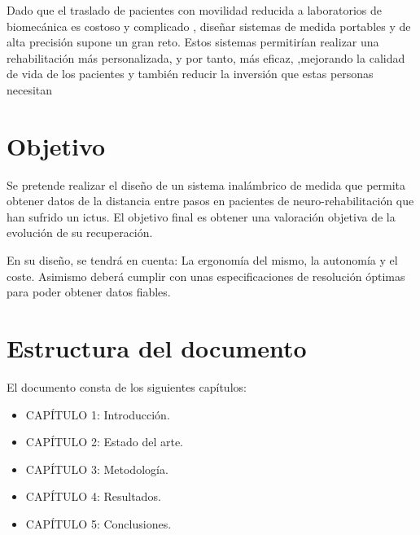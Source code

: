 Dado que el traslado de pacientes con movilidad reducida a laboratorios de biomecánica es costoso y complicado \cite{gasto}, diseñar sistemas de medida portables y de alta precisión supone un gran reto. Estos sistemas permitirían realizar una rehabilitación más personalizada, y por tanto, más eficaz, ,mejorando la calidad de vida de los pacientes y también reducir la inversión que estas personas necesitan





\section{Objetivo}\label{sec:objetivos}
Se pretende realizar el diseño de un sistema inalámbrico de medida que permita obtener datos de la distancia entre pasos en pacientes de neuro-rehabilitación que han sufrido un ictus. El objetivo final es obtener una valoración objetiva de la evolución de su recuperación.

En su diseño, se tendrá en cuenta: La ergonomía del mismo, la autonomía y el coste. Asimismo deberá cumplir con unas especificaciones de resolución óptimas para poder obtener datos fiables.


\section{Estructura del documento}

El documento consta de los siguientes capítulos: 

\begin{itemize}
	\item {CAPÍTULO 1: Introducción.}
	\item {CAPÍTULO 2: Estado del arte.}
	\item {CAPÍTULO 3: Metodología.}
	\item {CAPÍTULO 4: Resultados.}
	\item {CAPÍTULO 5: Conclusiones.}
\end{itemize}


